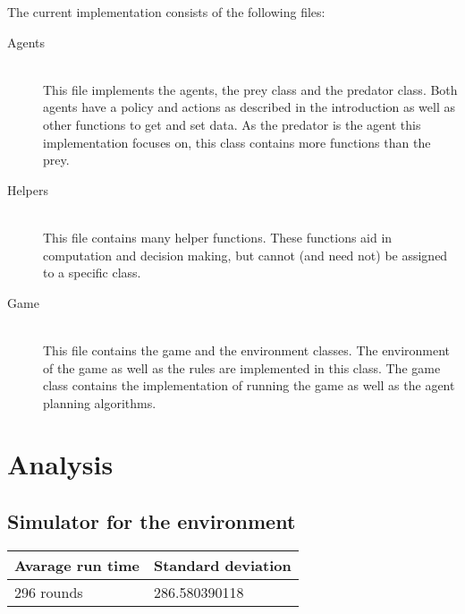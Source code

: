 \documentclass{article}
\begin{document}
\noindent The current implementation consists of the following files:
\begin{description}
	\item[Agents] \hfill \\ 
	This file implements the agents, the prey class and the predator class. Both agents have a policy and actions as described in the introduction as well as other functions to get and set data. As the predator is the agent this implementation focuses on, this class contains more functions than the prey.
	
	\item[Helpers] \hfill \\ 
	This file contains many helper functions. These functions aid in computation and decision making, but cannot (and need not) be assigned to a specific class.
	
	\item[Game] \hfill \\ 
	This file contains the game and the environment classes. The environment of the game as well as the rules are implemented in this class. The game class contains the implementation of running the game as well as the agent planning algorithms.
	
\end{description}


\section*{Analysis}


\subsection*{Simulator for the environment}


\begin{center}
	\begin{tabular}{  l ||  l }
		Avarage run time & Standard deviation \\ 
		\hline
		296 rounds &  286.580390118 %
	\end{tabular}
\end{center}
\end{document}
